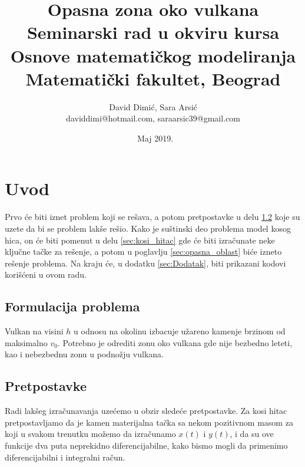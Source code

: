 \documentclass[a4paper]{article}
\begin{document}
\title{Opasna zona oko vulkana\\ \small{Seminarski rad u okviru kursa\\ Osnove matematičkog modeliranja\\ Matematički fakultet, Beograd}}
\author{David Dimić, Sara Arsić\\ daviddimi@hotmail.com, saraarsic39@gmail.com}

\date{~Maj 2019.}

\maketitle


\tableofcontents

\newpage

\section{Uvod}
\label{sec:uvod}
Prvo će biti iznet problem koji se rešava, a potom pretpostavke u delu
\ref{sec:pretpostavke} koje su uzete da bi se problem lakše rešio. Kako je 
suštinski deo problema model kosog hica, on će biti pomenut u delu \ref{sec:kosi_hitac}
gde će biti izračunate neke ključne tačke za rešenje, a potom u poglavlju
\ref{sec:opasna_oblast} biće izneto rešenje problema. Na kraju će, u dodatku
\ref{sec:Dodatak}, biti prikazani kodovi korišćeni u ovom radu.

\subsection{Formulacija problema}
Vulkan na visini $h$ u odnosu na okolinu izbacuje užareno kamenje brzinom od maksimalno
$v_0$. Potrebno je odrediti zonu oko vulkana gde nije bezbedno leteti, kao i 
nebezbednu zonu u podnožju vulkana.


\subsection{Pretpostavke}
\label{sec:pretpostavke}
Radi lakšeg izračunavanja uzećemo u obzir sledeće pretpostavke. 
Za kosi hitac pretpostavljamo \cite{Drazic} da je kamen materijalna tačka 
sa nekom pozitivnom masom za koji u svakom trenutku možemo da izračunamo $x(t)$ i $y(t)$,
i da su ove funkcije dva puta neprekidno diferencijabilne, kako bismo mogli da primenimo
diferencijabilni i integralni račun. \\
\end{document}
